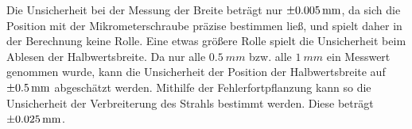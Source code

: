\documentclass[
	a4paper,
	12pt,
	pagesize,
	ngerman
]{scrartcl}
\begin{document}
Die Unsicherheit bei der Messung der Breite beträgt nur $\SI{\pm0,005}{mm}$, da sich die Position mit der Mikrometerschraube präzise bestimmen ließ, und spielt daher in der Berechnung keine Rolle. Eine etwas größere Rolle spielt die Unsicherheit beim Ablesen der Halbwertsbreite. Da nur alle $\SI{0,5}{mm}$ bzw. alle $\SI{1}{mm}$ ein Messwert genommen wurde, kann die Unsicherheit der Position der Halbwertsbreite auf $\SI{\pm0,5}{mm}$ abgeschätzt werden. Mithilfe der Fehlerfortpflanzung kann so die Unsicherheit der Verbreiterung des Strahls bestimmt werden. Diese beträgt $\SI{\pm0,025}{mm}$.
\end{document}
